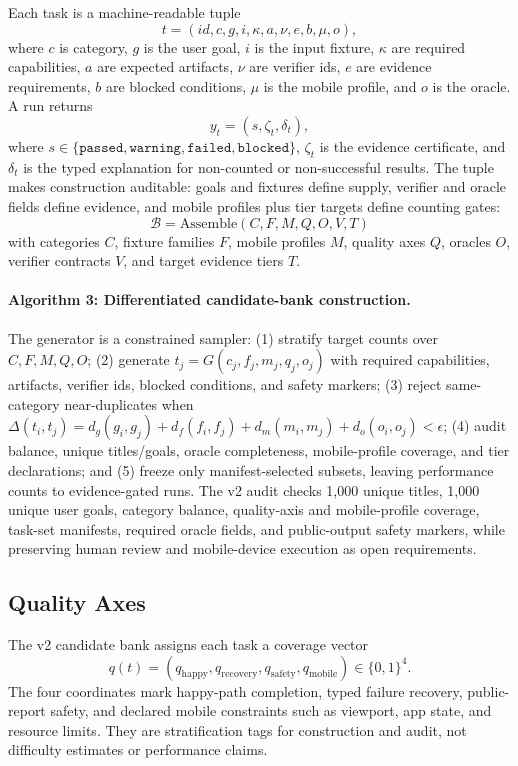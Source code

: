 \documentclass{article}
\begin{document}
Each task is a machine-readable tuple
\[
t=(id,c,g,i,\kappa,a,\nu,e,b,\mu,o),
\]
where \(c\) is category, \(g\) is the user goal, \(i\) is the input fixture, \(\kappa\) are required capabilities, \(a\) are expected artifacts, \(\nu\) are verifier ids, \(e\) are evidence requirements, \(b\) are blocked conditions, \(\mu\) is the mobile profile, and \(o\) is the oracle.
A run returns
\[
y_t=(s,\zeta_t,\delta_t),
\]
where \(s\in\{\texttt{passed},\texttt{warning},\texttt{failed},\texttt{blocked}\}\), \(\zeta_t\) is the evidence certificate, and \(\delta_t\) is the typed explanation for non-counted or non-successful results.
The tuple makes construction auditable: goals and fixtures define supply, verifier and oracle fields define evidence, and mobile profiles plus tier targets define counting gates:
\[
\mathcal{B}=\mathrm{Assemble}(C,F,M,Q,O,V,T)
\]
with categories \(C\), fixture families \(F\), mobile profiles \(M\), quality axes \(Q\), oracles \(O\), verifier contracts \(V\), and target evidence tiers \(T\).
\paragraph{Algorithm 3: Differentiated candidate-bank construction.}
The generator is a constrained sampler: (1) stratify target counts over \(C,F,M,Q,O\); (2) generate \(t_j=G(c_j,f_j,m_j,q_j,o_j)\) with required capabilities, artifacts, verifier ids, blocked conditions, and safety markers; (3) reject same-category near-duplicates when \(\Delta(t_i,t_j)=d_g(g_i,g_j)+d_f(f_i,f_j)+d_m(m_i,m_j)+d_o(o_i,o_j)<\epsilon\); (4) audit balance, unique titles/goals, oracle completeness, mobile-profile coverage, and tier declarations; and (5) freeze only manifest-selected subsets, leaving performance counts to evidence-gated runs.
The v2 audit checks 1,000 unique titles, 1,000 unique user goals, category balance, quality-axis and mobile-profile coverage, task-set manifests, required oracle fields, and public-output safety markers, while preserving human review and mobile-device execution as open requirements.

\subsection{Quality Axes}

The v2 candidate bank assigns each task a coverage vector
\[
q(t)=(q_{\mathrm{happy}},q_{\mathrm{recovery}},q_{\mathrm{safety}},q_{\mathrm{mobile}})\in\{0,1\}^4 .
\]
The four coordinates mark happy-path completion, typed failure recovery, public-report safety, and declared mobile constraints such as viewport, app state, and resource limits.
They are stratification tags for construction and audit, not difficulty estimates or performance claims.
\end{document}
